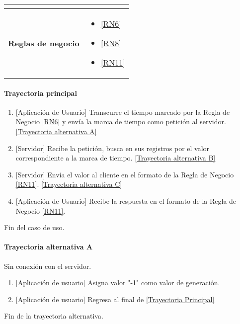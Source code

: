 \begin{longtable}{|J{5cm}|J{10.3cm}|}
\begin{itemize}
		\end{itemize} \\ \hline
	\textbf{Reglas de negocio} & 
		\begin{itemize}
		    \item \ref{RN6}
			\item \ref{RN8}
			\item \ref{RN11}
		\end{itemize} \\ \hline

\end{longtable}

\paragraph{Trayectoria principal}
    \label{SUB-M-CU1.5:TP}
	\begin{enumerate}
		\item {[Aplicación de Usuario]} Transcurre el tiempo marcado por la Regla de Negocio \ref{RN6} y envía la marca de tiempo como petición al servidor. \hyperref[SUB-M-CU5:TA]{[Trayectoria alternativa A]}
		\item {[Servidor]} Recibe la petición, busca en sus registros por el valor correspondiente a la marca de tiempo. \hyperref[SUB-M-CU5:TB]{[Trayectoria alternativa B]} 
		\item  {[Servidor]} Envía el valor al cliente en el formato de la Regla de Negocio \ref{RN11}. \hyperref[SUB-M-CU5:TC]{[Trayectoria alternativa C]}
        \item {[Aplicación de Usuario]} Recibe la respuesta en el formato de la Regla de Negocio \ref{RN11}. 
	\end{enumerate}
	Fin del caso de uso.

\paragraph{Trayectoria alternativa A} \label{SUB-M-CU5:TA}
	Sin conexión con el servidor.
	\begin{enumerate}[label=A\arabic*.]
		\item {[Aplicación de usuario]} Asigna valor "-1" como valor de generación.
		\item {[Aplicación de usuario]} Regresa al final de \hyperref[SUB-M-CU5:TP]{[Trayectoria Principal]}
	\end{enumerate}
	Fin de la trayectoria alternativa.

